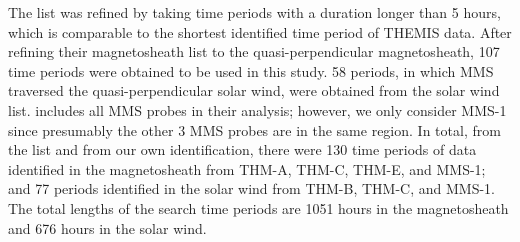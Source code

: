 The list \cite{ToyEdens:2024} was refined by taking time periods with a duration longer than 5 hours, which is comparable to the shortest identified time period of THEMIS data. 
After refining their magnetosheath list to the quasi-perpendicular magnetosheath, 107 time periods were obtained to be used in this study. 58 periods, in which MMS traversed the quasi-perpendicular solar wind, were obtained from the \cite{ToyEdens:2024} solar wind list. \cite{ToyEdens2:2024} includes all MMS probes in their analysis; however, we only consider MMS-1 since presumably the other 3 MMS probes are in the same region. In total, from the \cite{ToyEdens:2024} list and from our own identification, there were 130 time periods of data identified in the magnetosheath from THM-A, THM-C, THM-E, and MMS-1; and 77 periods identified in the solar wind from THM-B, THM-C, and MMS-1. The total lengths of the search time periods are 1051 hours in the magnetosheath and 676 hours in the solar wind.


